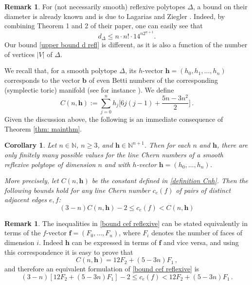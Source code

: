 \documentclass[12pt,a4paper]{amsart}
\newcommand{\NN}{\mathbb{N}}
\newtheorem{cor}[thm]{Corollary}
\theoremstyle{plain}
\theoremstyle{definition}
\newtheorem{rem}[thm]{Remark}
\begin{document}
\begin{rem}\label{comp Lagarias Ziegler}
For (not necessarily smooth) reflexive polytopes $\Delta$, a bound on their diameter is already known and is due to Lagarias
and Ziegler \cite{MR1138580}. Indeed, by combining Theorem 1 and 2 of their paper,  one can easily see that
 \[d_{\Delta}\leq  n\cdot n!\cdot 14^{n2^{n+1}}.\]
 Our bound \eqref{upper bound d refl} is different, as it is also a function of the number of vertices $|V|$ of $\Delta$.
\end{rem}


We recall that, for a smooth polytope $\Delta$, its $h$-vector $\mathbf{h}=(h_0,h_1,\ldots,h_n)$ corresponds to the vector $\mathbf{b}$ of even Betti numbers of the corresponding (symplectic toric) manifold (see for instance \cite[Lemma 3.8]{MR3695881}). We define
\begin{equation}\label{definition Cnh}
C(n,\mathbf{h}):=\sum_{j=0}^n h_{j}\Big[ 6j(j-1)+\frac{5n-3n^2}{2}\Big]\,.
\end{equation}
Given the discussion above, the following is an immediate consequence of Theorem \ref{thm: mainthm}.
\begin{cor}\label{cor reflexive}
Let $n\in \NN$, $n\geq 3$, and $\mathbf{h}\in \NN^{n+1}$. 
Then for each $n$ and $\mathbf{h}$, there are only finitely many possible values for the line Chern numbers of a smooth
reflexive polytope of dimension $n$ and with $h$-vector $\mathbf{h}=(h_0,\ldots,h_n)$. 

More precisely, let $C(n,\mathbf{h})$ be the constant defined in \eqref{definition Cnh}. 
Then the following bounds hold for any line Chern number $c_e(f)$ of pairs of distinct adjacent edges $e,f$:
\begin{equation}\label{bound cef reflexive}
(3-n)C(n,\mathbf{h})-2\leq c_e(f)< C(n,\mathbf{h})
\end{equation}
\end{cor}
\begin{rem}
The inequalities in \eqref{bound cef reflexive} can be stated equivalently in terms of the $f$-vector $\mathbf{f}=(F_0,\ldots,F_n)$, where
$F_i$ denotes the number of faces of dimension $i$. Indeed $\mathbf{h}$ can be expressed in terms of $\mathbf{f}$ and vice versa, and
using this correspondence it is easy to prove that $$C(n,\mathbf{h})=12F_2+(5-3n)F_1\,,$$ and therefore an equivalent formulation of \eqref{bound cef reflexive} is
\begin{equation}\label{bound cef reflexive f}
(3-n)[12F_2+(5-3n)F_1]-2\leq c_e(f)< 12F_2+(5-3n)F_1\,.
\end{equation}
\end{rem}
\end{document}
